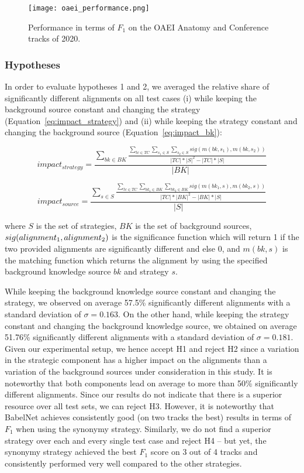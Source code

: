 \documentclass[runningheads]{llncs}
\begin{document}
\begin{figure}
    \centering
    \texttt{[image: oaei\_performance.png]}
    \caption{Performance in terms of $F_1$ on the OAEI Anatomy and Conference tracks of 2020.}
    \label{fig:oaei_performance}
\end{figure}

\subsubsection{Hypotheses}
In order to evaluate hypotheses 1 and 2, we averaged the relative share of significantly different alignments on all test cases (i) while keeping the background source constant and changing the strategy (Equation~\ref{eq:impact_strategy}) and (ii) while keeping the strategy constant and changing the background source (Equation~\ref{eq:impact_bk}):

\begin{equation}
    impact_{strategy} = \frac{\sum_{bk \in BK}  \frac{ \sum_{tc \in TC} \sum_{s_1 \in S} \sum_{s_2 \in S} sig(m(bk, s_1), m(bk, s_2))  }{|TC| * |S|^2 - |TC| * |S|}}{|BK|}
    \label{eq:impact_strategy}
\end{equation}

\begin{equation}
    impact_{source} = \frac{\sum_{s \in S}  \frac{ \sum_{tc \in TC} \sum_{bk_1 \in BK} \sum_{bk_2 \in BK} sig(m(bk_1, s), m(bk_2, s))  }{|TC| * |BK|^2 - |BK| * |S|}}{|S|}
    \label{eq:impact_bk}
\end{equation}

\noindent where $S$ is the set of strategies, $BK$ is the set of background sources, $sig(align\-ment_1, alignment_2)$ is the significance function which will return 1 if the two provided alignments are significantly different and else 0, and $m(bk, s)$ is the matching function which returns the alignment by using the specified background knowledge source $bk$ and strategy $s$.


While keeping the background knowledge source constant and changing the strategy, we observed on average 57.5\% significantly different alignments with a standard deviation of $\sigma = 0.163$. On the other hand, while keeping the strategy constant and changing the background knowledge source, we obtained on average 51.76\% significantly different alignments with a standard deviation of $\sigma = 0.181$. Given our experimental setup, we hence accept H1 and reject H2 since a variation in the strategic component has a higher impact on the alignments than a variation of the background sources under consideration in this study. It is noteworthy that both components lead on average to more than 50\% significantly different alignments.
%
Since our results do not indicate that there is a superior resource over all test sets, we can reject H3. However, it is noteworthy that BabelNet achieves consistently good (on two tracks the best) results in terms of $F_1$ when using the synonymy strategy. 
%
Similarly, we do not find a superior strategy over each and every single test case and reject H4 -- but yet, the synonymy strategy achieved the best $F_1$ score on 3 out of 4 tracks and consistently performed very well compared to the other strategies. 
\end{document}
